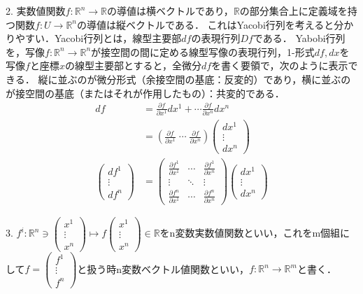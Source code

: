 \documentclass[uplatex, dvipdfmx]{jsreport}
\begin{document}
2. 実数値関数$f:\mathbb{R}^n\to\mathbb{R}$の導値は横ベクトルであり，$\mathbb{R}$の部分集合上に定義域を持つ関数$f:U\to\mathbb{R}^n$の導値は縦ベクトルである．
これはYacobi行列を考えると分かりやすい．Yacobi行列とは，線型主要部$df$の表現行列$Df$である．
Yabobi行列を，写像$f:\mathbb{R}^n\to\mathbb{R}^n$が接空間の間に定める線型写像の表現行列，1-形式$df,dx$を写像$f$と座標$x$の線型主要部とすると，全微分$df$を書く要領で，次のように表示できる．
縦に並ぶのが微分形式（余接空間の基底：反変的）であり，横に並ぶのが接空間の基底（またはそれが作用したもの）：共変的である．
\begin{align*}
    df &= \frac{\partial f}{\partial x^1}dx^1 + \cdots \frac{\partial f}{\partial x^n}dx^n\\
    &= \left( \frac{\partial f}{\partial x^1}\;\cdots\;\frac{\partial f}{\partial x^n} \right)\begin{pmatrix}dx^1\\\vdots\\dx^n\end{pmatrix}\\
    \begin{pmatrix}df^1\\\vdots\\df^n\end{pmatrix} &= \begin{pmatrix}\frac{\partial f^1}{\partial x^1}&\cdots&\frac{\partial f^1}{\partial x^n}\\\vdots&\ddots&\vdots\\\frac{\partial f^n}{\partial x^1}&\cdots&\frac{\partial f^n}{\partial x^n}\end{pmatrix}\begin{pmatrix}dx^1\\\vdots\\dx^n\end{pmatrix}
\end{align*}
\begin{center}
\end{center}

3. $f^i:\mathbb{R}^n\ni\begin{pmatrix}x^1\\\vdots\\x^n\end{pmatrix}\mapsto f\begin{pmatrix}x^1\\\vdots\\x^n\end{pmatrix}\in\mathbb{R}$をn変数実数値関数といい，これをm個組にして$f=\begin{pmatrix}f^1\\\vdots\\f^n\end{pmatrix}$と扱う時n変数ベクトル値関数といい，$f:\mathbb{R}^n\to\mathbb{R}^m$と書く．
\end{document}
